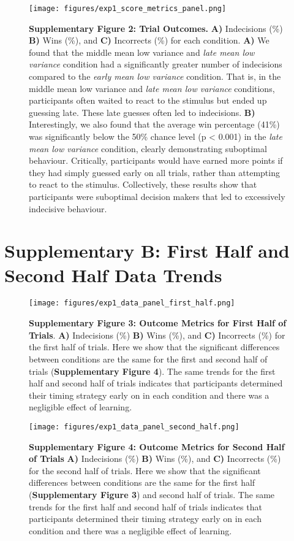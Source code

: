 \documentclass[man,floatsintext,letterpaper,12pt]{apa7}
\newcommand\boldblue[1]{\textcolor{mydarkblue}{\textbf{#1}}}
\begin{document}
\begin{figure}[H]
    \centering
    \texttt{[image: figures/exp1\_score\_metrics\_panel.png]}

    \caption*{\boldblue{Supplementary Figure 2: Trial Outcomes.} \boldblue{A)} Indecisions (\%) \boldblue{B)} Wins (\%), and \boldblue{C)} Incorrects (\%) for each condition. \boldblue{A)} We found that the middle mean low variance and \emph{late mean low variance} condition had a significantly greater number of indecisions compared to the \emph{early mean low variance} condition. That is, in the middle mean low variance and \emph{late mean low variance} conditions, participants often waited to react to the stimulus but ended up guessing late. These late guesses often led to indecisions. \boldblue{B)} Interestingly, we also found that the average win percentage (41\%) was significantly below the 50\% chance level (p < 0.001) in the \emph{late mean low variance} condition, clearly demonstrating suboptimal behaviour. Critically, participants would have earned more points if they had simply guessed early on all trials, rather than attempting to react to the stimulus. Collectively, these results show that participants were suboptimal decision makers that led to excessively indecisive behaviour.}
\end{figure}
\newpage
\section{Supplementary B: First Half and Second Half Data Trends}
\vspace{-1mm}
\begin{figure}[H]
    \centering
    \texttt{[image: figures/exp1\_data\_panel\_first\_half.png]}
    \caption*{
        \boldblue{Supplementary Figure 3: Outcome Metrics for First Half of Trials}. \boldblue{A)} Indecisions (\%) \boldblue{B)} Wins (\%), and \boldblue{C)} Incorrects (\%) for the first half of trials. 
        Here we show that the significant differences between conditions are the same for the first and second half of trials (\boldblue{Supplementary Figure 4}).         
        The same trends for the first half and second half of trials indicates that participants determined their timing strategy early on in each condition and there was a negligible effect of learning. 
    } 
\end{figure}

\begin{figure}[H]
    \centering
    \texttt{[image: figures/exp1\_data\_panel\_second\_half.png]}

    \caption*{
        \boldblue{Supplementary Figure 4: Outcome Metrics for Second Half of Trials} \boldblue{A)} Indecisions (\%) \boldblue{B)} Wins (\%), and \boldblue{C)} Incorrects (\%) for the second half of trials. 
        Here we show that the significant differences between conditions are the same for the first half (\boldblue{Supplementary Figure 3}) and second half of trials.         
        The same trends for the first half and second half of trials indicates that participants determined their timing strategy early on in each condition and there was a negligible effect of learning. 
    } 
\end{figure}
\end{document}
